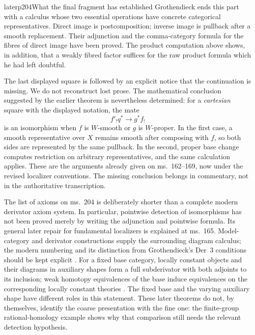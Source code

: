\begin{dcomment}{later}{p204}{What the final fragment has established}
Grothendieck ends this part with a calculus whose two essential operations have concrete categorical representatives. Direct image is postcomposition; inverse image is pullback after a smooth replacement. Their adjunction and the comma-category formula for the fibres of direct image have been proved. The product computation above shows, in addition, that a weakly fibred factor suffices for the raw product formula which he had left doubtful.

The last displayed square is followed by an explicit notice that the continuation is missing. We do not reconstruct lost prose. The mathematical conclusion suggested by the earlier theorem is nevertheless determined: for a \emph{cartesian} square with the displayed notation, the mate
\[
f'_!q^*\longrightarrow g^*f_!
\]
is an isomorphism when $f$ is $W$-smooth or $g$ is $W$-proper. In the first case, a smooth representative over $X$ remains smooth after composing with $f$, so both sides are represented by the same pullback. In the second, proper base change computes restriction on arbitrary representatives, and the same calculation applies. These are the arguments already given on ms.~162--169, now under the revised localizer conventions. The missing conclusion belongs in commentary, not in the authoritative transcription.

The list of axioms on ms.~204 is deliberately shorter than a complete modern derivator axiom system. In particular, pointwise detection of isomorphisms has not been proved merely by writing the adjunction and pointwise formula. Its general later repair for fundamental localizers is explained at ms.~165. Model-category and derivator constructions supply the surrounding diagram calculus; the modern numbering and its distinction from Grothendieck's Der~3 conditions should be kept explicit \citep[Section~1]{Groth2013}. For a fixed base category, locally constant objects and their diagrams in auxiliary shapes form a full subderivator with both adjoints to its inclusion; weak homotopy equivalences of the base induce equivalences on the corresponding locally constant theories \citep[Theorems~3.12 and~1.3]{Cisinski2009LocallyConstant}. The fixed base and the varying auxiliary shape have different roles in this statement. These later theorems do not, by themselves, identify the coarse presentation with the fine one: the finite-group rational-homology example shows why that comparison still needs the relevant detection hypothesis.
\end{dcomment}
